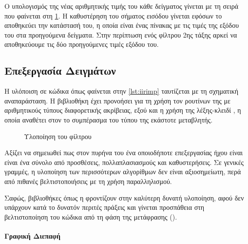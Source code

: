\documentclass[12pt]{extarticle}
\begin{document}
Ο υπολογισμός της νέας αριθμητικής τιμής του κάθε δείγματος γίνεται με 
τη σειρά που φαίνεται στη \cref{fig:iir_filter_block}. 
Η καθυστέρηση του σήματος εισόδου γίνεται εφόσων το 
αποθηκεύει την κατάστασή του, η οποία είναι ένας πίνακας με τις τιμές της εξόδου 
του στα προηγούμενα δείγματα. Στην περίπτωση ενός φίλτρου 2ης τάξης 
αρκεί να αποθηκεύουμε τις δύο προηγούμενες τιμές εξόδου του.

\subsection{Επεξεργασία Δειγμάτων}

Η υλόποιση σε κώδικα όπως φαίνεται στην \cref{lst:iirimp} ταυτίζεται με τη σχηματική 
αναπαράσταση. Η βιβλιοθήκη  έχει προνοήσει για τη χρήση τον ρουτίνων 
της με αριθμητικούς τύπους διαφορετικής ακρίβειας, εξού και η χρήση της 
λέξης-κλειδί  \cite{CppReferenceAuto}, η οποία αναθέτει στον  το συμπέρασμα του τύπου 
της εκάστοτε μεταβλητής.

\begin{figure}
\centering
    
\caption{Υλοποίηση του  φίλτρου}
\label{fig:iir_filter_block}

\end{figure}

\begin{minipage}{\textwidth}
\end{minipage}

Αξίζει να σημειωθεί πως στον πυρήνα του ένα οποιοδήποτε  επεξεργασίας 
ήχου είναι είναι ένα σύνολο από προσθέσεις, πολλαπλασιασμούς και καθυστερήσεις. 
Σε γενικές γραμμές, η υλοποίηση των περισσότερων 
αλγορίθμων δεν είναι αξιοσημείωτη, περά από πιθανές βελτιστοποιήσεις με τη χρήση παραλληλισμού. 

Σαφώς, βιβλιοθήκες όπως η  φροντίζουν στην καλύτερη δυνατή υλοποίηση, 
αφού δεν υπάρχουν κατά το δυνατόν περιτές πράξεις και γίνεται προσπάθεια 
στη βελτιστοποίηση του κώδικα από τη φάση της μετάφρασης ().

\paragraph{Γραφική Διεπαφή}

\epigraph{}{}
\end{document}
